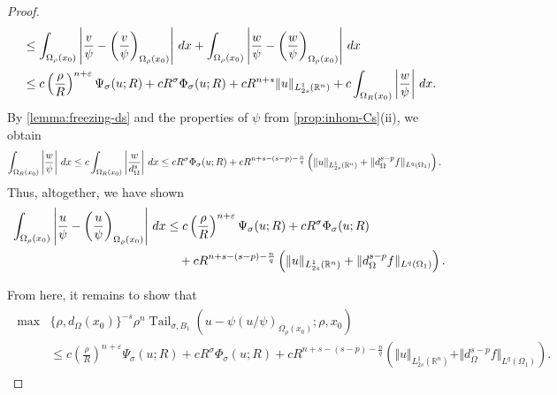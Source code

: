 \documentclass[11pt,reqno]{amsart}
\theoremstyle{plain}
\theoremstyle{definition}
\numberwithin{equation}{section}
\newcommand{\R}{\mathbb{R}}
\newcommand{\1}{\mathbbm{1}}
\DeclareMathOperator{\tail}{Tail}
\renewcommand{\d}{\textnormal{\,d}}
\begin{document}
\begin{proof}
\begin{align*}
&\leq \int_{\Omega_{\rho}(x_0)} \left|\frac{v}{\psi} - \left( \frac{v}{\psi} \right)_{\Omega_{\rho}(x_0)} \right| \d x + \int_{\Omega_{\rho}(x_0)} \left|\frac{w}{\psi} - \left( \frac{w}{\psi} \right)_{\Omega_{\rho}(x_0)} \right| \d x \\
&\leq c \left( \frac{\rho}{R} \right)^{n+\varepsilon} \Psi_\sigma(u; R) + cR^{\sigma}\Phi_{\sigma}(u; R) + c R^{n+s} \Vert u \Vert_{L^1_{2s}(\R^n)} + c\int_{\Omega_R(x_0)} \left|\frac{w}{\psi}\right| \d x.
\end{align*}
By \autoref{lemma:freezing-ds} and the properties of $\psi$ from \autoref{prop:inhom-Cs}(ii), we obtain
\begin{align*}
\int_{\Omega_R(x_0)} \left|\frac{w}{\psi} \right| \d x
&\leq c \int_{\Omega_{R}(x_0)} \left|\frac{w}{d_\Omega^s} \right| \d x \leq cR^\sigma \Phi_{\sigma}(u; R) + cR^{n+s-(s-p)-\frac{n}{q}} \left( \Vert u \Vert_{L^1_{2s}(\R^n)} + \Vert d_{\Omega}^{s-p} f \Vert_{L^q(\Omega_{1})} \right).
\end{align*}
Thus, altogether, we have shown
\begin{align}
\label{eq:Campanato-boundary-help1}
\begin{split}
\int_{\Omega_{\rho}(x_0)} \left|\frac{u}{\psi} - \left( \frac{u}{\psi} \right)_{\Omega_{\rho}(x_0)} \right| \d x 
&\le c \left( \frac{\rho}{R} \right)^{n+\varepsilon} \Psi_\sigma(u; R) + cR^\sigma \Phi_{\sigma}(u; R) \\
&\quad + cR^{n + s-(s-p)-\frac{n}{q}} \left( \Vert u \Vert_{L^1_{2s}(\R^n)} + \Vert d_{\Omega}^{s-p} f \Vert_{L^q(\Omega_{1})} \right).
\end{split}
\end{align}

From here, it remains to show that
\begin{align}
\label{eq:tail-higher-campanato-u}
\begin{split}
\max&\{\rho,d_{\Omega}(x_0)\}^{-s} \rho^{n} \tail_{\sigma,B_1}(u - \psi (u/\psi)_{\Omega_{\rho}(x_0)};\rho,x_0) \\
&\le c \left( \frac{\rho}{R} \right)^{n+\varepsilon} \Psi_\sigma(u; R) + cR^\sigma \Phi_{\sigma}(u; R) + cR^{n + s-(s-p)-\frac{n}{q}} \left( \Vert u \Vert_{L^1_{2s}(\R^n)} + \Vert d_{\Omega}^{s-p} f \Vert_{L^q(\Omega_{1})} \right).
\end{split}
\end{align}


\end{proof}
\end{document}
